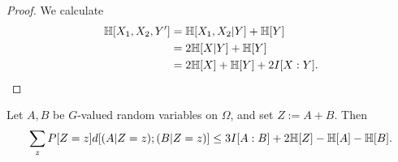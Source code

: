 \begin{proof}  We calculate
  \begin{equation}
  \begin{split} \mathbb{H}[X_1, X_2, Y'] &= \mathbb{H}[X_1,X_2|Y] + \mathbb{H}[Y] \\
    &= 2 \mathbb{H}[X|Y] + \mathbb{H}[Y] \\
    &= 2 \mathbb{H}[X] + \mathbb{H}[Y] + 2 I[X:Y].
  \end{split}  \end{equation}
\end{proof}


\begin{lemma}\label{lem-bsg}
  Let $A,B$ be $G$-valued random variables on $\Omega$, and set $Z := A+B$.
Then
\begin{equation}\label{2-bsg-takeaway} \sum_{z} P[Z=z] d[(A | Z = z); (B | Z = z)] \leq 3 I[A:B] + 2 \mathbb{H}[Z] - \mathbb{H}[A] - \mathbb{H}[B]. \end{equation}
\end{lemma}

